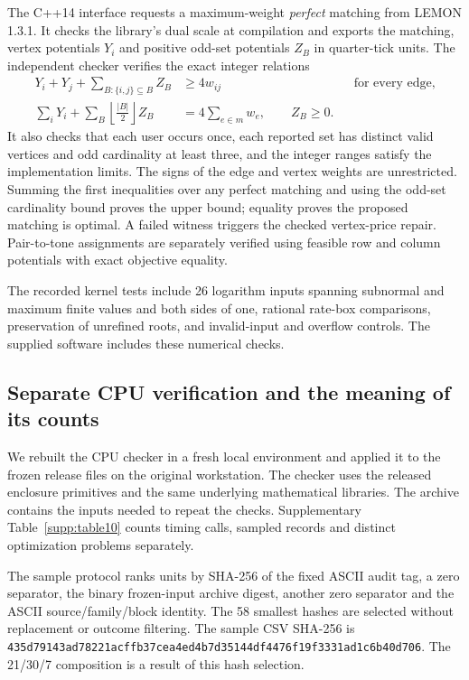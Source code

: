 \documentclass[10pt,letterpaper]{article}
\begin{document}
The C++14 interface requests a maximum-weight \emph{perfect} matching from LEMON 1.3.1. It checks the library's dual scale at compilation and exports the matching, vertex potentials \(Y_i\) and positive odd-set potentials \(Z_B\) in quarter-tick units. The independent checker verifies the exact integer relations
\begin{equation}
 \begin{aligned}
 Y_i+Y_j+\sum_{B:\{i,j\}\subseteq B}Z_B&\geq4w_{ij}
                   &&\text{for every edge},\\
 \sum_iY_i+\sum_B\left\lfloor\frac{|B|}{2}\right\rfloor Z_B
                &=4\sum_{e\in m}w_e,\qquad Z_B\geq0 .
 \end{aligned}
 \label{supp:eq:quartertick}
\end{equation}
It also checks that each user occurs once, each reported set has distinct valid vertices and odd cardinality at least three, and the integer ranges satisfy the implementation limits. The signs of the edge and vertex weights are unrestricted. Summing the first inequalities over any perfect matching and using the odd-set cardinality bound proves the upper bound; equality proves the proposed matching is optimal. A failed witness triggers the checked vertex-price repair. Pair-to-tone assignments are separately verified using feasible row and column potentials with exact objective equality.

The recorded kernel tests include 26 logarithm inputs spanning subnormal and maximum finite values and both sides of one, rational rate-box comparisons, preservation of unrefined roots, and invalid-input and overflow controls. The supplied software includes these numerical checks.

\clearpage
\subsection*{Separate CPU verification and the meaning of its counts}
We rebuilt the CPU checker in a fresh local environment and applied it to the frozen release files on the original workstation. The checker uses the released enclosure primitives and the same underlying mathematical libraries. The archive contains the inputs needed to repeat the checks. Supplementary Table~\ref{supp:table10} counts timing calls, sampled records and distinct optimization problems separately.



The sample protocol ranks units by SHA-256 of the fixed ASCII audit tag,
a zero separator, the binary frozen-input archive digest, another zero separator and
the ASCII source/family/block identity. The 58 smallest hashes are selected
without replacement or outcome filtering. The sample CSV SHA-256 is
\texttt{435d79143ad78221acffb37cea4ed4b7d}\allowbreak\texttt{35144df4476f19f3331ad1c6b40d706}.
The 21/30/7 composition is a result of this hash selection.
\end{document}

